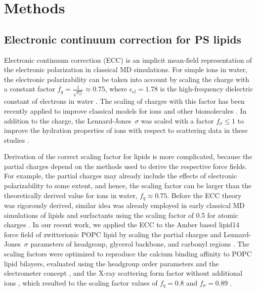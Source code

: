 \documentclass[journal=jpcbfk,manuscript=article]{achemso}
\begin{document}
\section{Methods} 
 
\subsection{Electronic continuum correction for PS lipids}\label{section:ecc} 

Electronic continuum correction (ECC) is an implicit mean-field representation of 
the electronic polarization in classical MD simulations. 
For simple ions in water, the electronic polarizability
can be taken into account by scaling the charge with a constant factor 
 \mbox{$ f_q = \frac{1}{\sqrt{\epsilon_{el}}} \approx 0.75$,}
where  $\epsilon_{el} = 1.78$ is the high-frequency dielectric constant of electrons in water \cite{leontyev09}.
The scaling of charges with this factor has been recently applied to improve classical models for ions and
other biomolecules \cite{Pluharova2014, martinek17, duboue2018insulin, Mason2019, Duboue2018MgZn} .
In addition to the charge, the Lennard-Jones~$\sigma$ was scaled with a factor $f_\sigma \leq 1$
to improve the hydration properties of ions with respect to scattering data in these studies
.

Derivation of the correct scaling factor for lipids is more complicated, because
the partial charges depend on the methods used to derive the respective force fields.
For example, the partial charges may already include the effects of electronic polarizability to some extent,
and hence, the scaling factor can be larger than the theoretically derived value for ions in water, $f_q \approx 0.75$.
Before the ECC theory was rigorously derived, similar idea was already employed in early classical 
MD simulations of lipids and surfactants using the scaling factor of 0.5 for atomic charges  \cite{jonsson86,egberts94, berendsen1996}. 
In our recent work, we applied the ECC to the Amber based lipid14 force field of zwitterionic POPC lipid \cite{dickson14}
by scaling the partial charges and Lennard-Jones~$\sigma$ parameters of headgroup, glycerol backbone,
and carbonyl regions \cite{melcr18}. The scaling factors were optimized to reproduce 
the calcium binding affinity to POPC lipid bilayers, evaluated using the headgroup order parameters
and the electrometer concept \cite{akutsu81,altenbach84,seelig87,catte16}, and the X-ray scattering form factor
without additional ions \cite{kucerka11}, which resulted to the scaling factor values of $f_q = 0.8$ and $f_\sigma = 0.89$  \cite{melcr18}.
\end{document}

